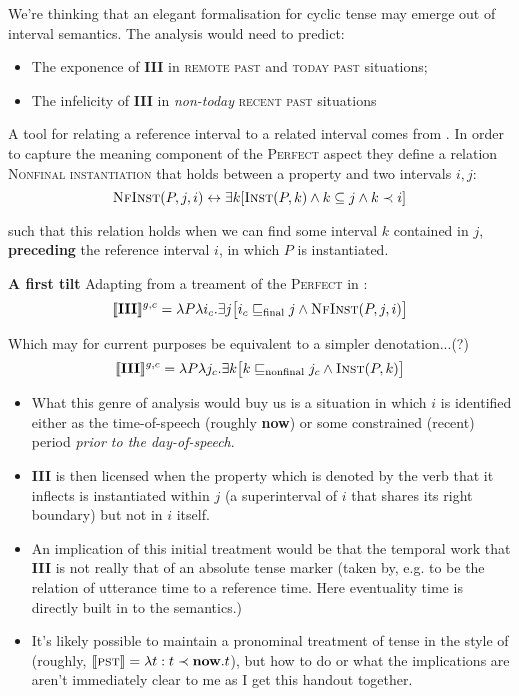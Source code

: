 \documentclass[11pt]{article}
\begin{document}
We're thinking that an elegant formalisation for cyclic tense may emerge out of interval semantics. The analysis would need to predict:

\begin{itemize}
\item The exponence of \textbf{III} in \textsc{remote past} and \textsc{today past} situations;
\item The infelicity of \textbf{III} in \textit{non-today} \textsc{recent past} situations
\end{itemize}


A tool for relating a reference interval to a related interval comes from \citet{Condoravdi2014}. In order to capture the meaning component of the \textsc{Perfect} aspect they define a relation \textsc{Nonfinal instantiation} that holds between a property and two intervals $i,j$:
$$\textsc{NfInst}(P,j,i)\leftrightarrow\exists k [\textsc{Inst}(P,k)\wedge k\subseteq j\wedge k\prec i]$$

such that this relation holds when we can find some interval $k$ contained in $j$, \textbf{preceding} the reference interval $i$, in which $P$ is instantiated.

\pex \textbf{A first tilt}
\a Adapting from a treament of the \textsc{Perfect} in \citet{Condoravdi2014}:
$$\llbracket\textbf{III}\rrbracket^{g,c}=\lambda P\lambda i_c.\exists j\big[i_c\sqsubseteq_{\text{final}}j\wedge\textsc{NfInst}(P,j,i)\big]$$

\a Which may for current purposes be equivalent to a simpler denotation...(?)
$$\llbracket\textbf{III}\rrbracket^{g,c}=\lambda P\lambda j_c.\exists k\big[k\sqsubseteq_{\text{nonfinal}}j_c\wedge\textsc{Inst}(P,k)\big]$$\xe

\begin{itemize}

\item What this genre of analysis would buy us is a situation in which $i$ is identified either as the time-of-speech (roughly \textbf{now}) or some constrained (recent) period \textit{prior to the day-of-speech}.


\item \textbf{III} is then licensed when the property which is denoted by the verb that it inflects is instantiated within $j$ (a superinterval of $i$ that shares its right boundary) but not in $i$ itself.




\item An implication of this initial treatment would be that the temporal work that \textbf{III} is not really that of an absolute tense marker (taken by, e.g. \citealt{Klein2009} to be the relation of utterance time to a reference time. Here eventuality time is directly built in to the semantics.)

\item It's likely possible to maintain a pronominal treatment of tense in the style of \citet{Partee1973} (roughly, $\llbracket\textsc{pst}\rrbracket=\lambda t:t\prec\textbf{now}.t$), but how to do or what the implications are aren't immediately clear to me as I get this handout together.

\end{itemize}
\newpage
\end{document}

